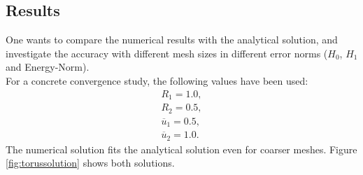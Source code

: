 \documentclass[a4paper,12pt]{article}
\begin{document}
\subsection{Results}
One wants to compare the numerical results with the analytical solution, and investigate the accuracy with different mesh sizes in different error norms ($H_{0}$, $H_{1}$ and Energy-Norm). \\
For a concrete convergence study, the following values have been used:
\begin{eqnarray}
R_1 = 1.0,\\
R_2 = 0.5,\\
\overline{u}_1 = 0.5,\\
\overline{u}_2 = 1.0. 
\end{eqnarray}
The numerical solution fits the analytical solution even for coarser meshes. Figure \ref{fig:torussolution} shows both solutions.
\end{document}
